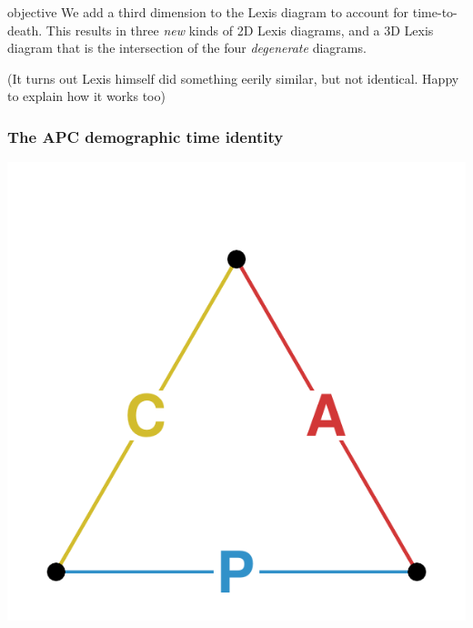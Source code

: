\documentclass[20pt]{beamer}
\begin{document}

\begin{frame}
\begin{block}{objective}
We add a third dimension to the Lexis diagram to account for time-to-death. This
results in three \textit{new} kinds of 2D Lexis diagrams, and a 3D Lexis diagram
that is the intersection of the four \textit{degenerate} diagrams.
\end{block}
\color{mygray}(It turns out Lexis himself did something eerily similar, but not
identical. Happy to explain how it works too)
\end{frame}

\begin{frame}
\frametitle{The APC demographic time identity}
\vspace{-4em}
\begin{center}
\includegraphics[scale=1.7]{Figures/APCid.pdf}
\end{center}
\end{frame}

\end{document}
